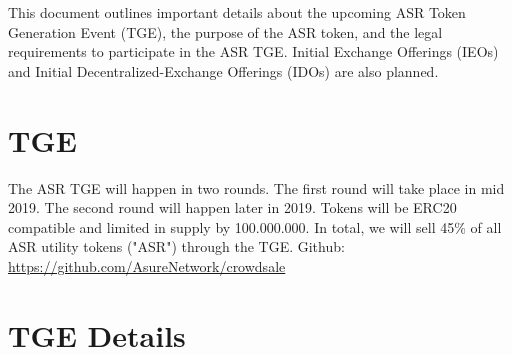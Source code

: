 
This document outlines important details about the upcoming ASR Token Generation Event (TGE), the purpose of the ASR token, and the legal requirements to participate in the ASR TGE. Initial Exchange Offerings (IEOs) and Initial Decentralized-Exchange Offerings (IDOs) are also planned.

\section{TGE}
The ASR TGE will happen in two rounds. The first round will take place in mid 2019. The second round will happen later in 2019. Tokens will be ERC20 compatible and limited in supply by 100.000.000. In total, we will sell 45\% of all ASR utility tokens ("ASR") through the TGE.
\newline\newline
Github: \url{https://github.com/AsureNetwork/crowdsale}

\newpage

\section{TGE Details}


